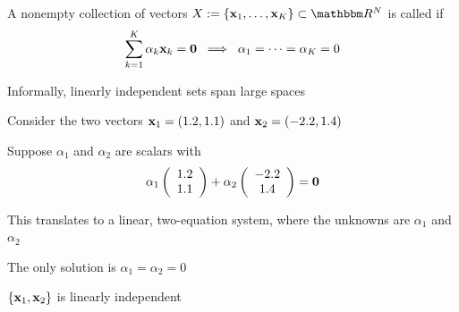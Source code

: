 \begin{frame}

    \vspace{2em}
    
    
    A nonempty collection of vectors $X := \{\boldx_1,\ldots, \boldx_K\}
    \subset \RR^N$ is called  if
    \begin{equation*}
        \sum_{k=1}^K \alpha_k {\mathbf x}_k
         = {\mathbf 0} 
        \; \implies \;
        \alpha_1 = \cdots = \alpha_K = 0
    \end{equation*}

    \vspace{1em}
    
    Informally, linearly independent sets span large spaces

\end{frame}


\begin{frame}
    
    \vspace{2em}
    \Eg 
    Consider the two vectors ${\mathbf x}_1 = (1.2, 1.1)$ and ${\mathbf x}_2 = (-2.2, 1.4)$
    
    Suppose $\alpha_1$ and $\alpha_2$ are scalars with
    \begin{equation*}
        \alpha_1
        \left(
        \begin{array}{c}
            1.2 \\
            1.1
        \end{array}
        \right)
        + 
        \alpha_2
        \left(
        \begin{array}{c}
            -2.2 \\
            1.4
        \end{array}
        \right)
        =
        {\mathbf 0}
    \end{equation*}
    
    This translates to a linear, two-equation system, where the unknowns
    are $\alpha_1$ and $\alpha_2$ 
    
    The only solution is $\alpha_1 = \alpha_2 = 0$
    
    $\{{\mathbf x}_1, {\mathbf x}_2\}$ is linearly independent


\end{frame}

